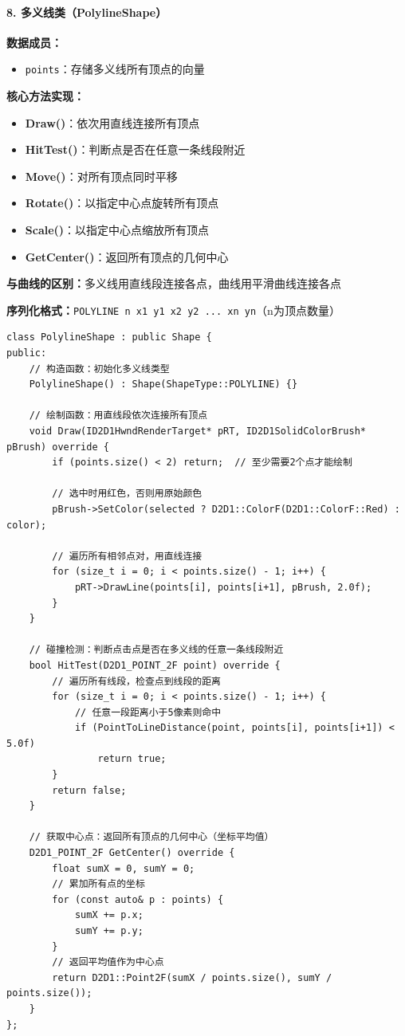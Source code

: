 \documentclass[12pt,a4paper]{article}
\begin{document}
\paragraph{8. 多义线类（PolylineShape）}

\begin{tcolorbox}
\textbf{数据成员：}
\begin{itemize}
    \item \texttt{points}：存储多义线所有顶点的向量
\end{itemize}

\textbf{核心方法实现：}
\begin{itemize}
    \item \textbf{Draw()}：依次用直线连接所有顶点
    \item \textbf{HitTest()}：判断点是否在任意一条线段附近
    \item \textbf{Move()}：对所有顶点同时平移
    \item \textbf{Rotate()}：以指定中心点旋转所有顶点
    \item \textbf{Scale()}：以指定中心点缩放所有顶点
    \item \textbf{GetCenter()}：返回所有顶点的几何中心
\end{itemize}

\textbf{与曲线的区别：}多义线用直线段连接各点，曲线用平滑曲线连接各点

\textbf{序列化格式：}\texttt{POLYLINE n x1 y1 x2 y2 ... xn yn}（n为顶点数量）
\end{tcolorbox}

\begin{lstlisting}[caption=PolylineShape类定义]
class PolylineShape : public Shape {
public:
    // 构造函数：初始化多义线类型
    PolylineShape() : Shape(ShapeType::POLYLINE) {}
    
    // 绘制函数：用直线段依次连接所有顶点
    void Draw(ID2D1HwndRenderTarget* pRT, ID2D1SolidColorBrush* pBrush) override {
        if (points.size() < 2) return;  // 至少需要2个点才能绘制
        
        // 选中时用红色，否则用原始颜色
        pBrush->SetColor(selected ? D2D1::ColorF(D2D1::ColorF::Red) : color);
        
        // 遍历所有相邻点对，用直线连接
        for (size_t i = 0; i < points.size() - 1; i++) {
            pRT->DrawLine(points[i], points[i+1], pBrush, 2.0f);
        }
    }
    
    // 碰撞检测：判断点击点是否在多义线的任意一条线段附近
    bool HitTest(D2D1_POINT_2F point) override {
        // 遍历所有线段，检查点到线段的距离
        for (size_t i = 0; i < points.size() - 1; i++) {
            // 任意一段距离小于5像素则命中
            if (PointToLineDistance(point, points[i], points[i+1]) < 5.0f)
                return true;
        }
        return false;
    }
    
    // 获取中心点：返回所有顶点的几何中心（坐标平均值）
    D2D1_POINT_2F GetCenter() override {
        float sumX = 0, sumY = 0;
        // 累加所有点的坐标
        for (const auto& p : points) {
            sumX += p.x;
            sumY += p.y;
        }
        // 返回平均值作为中心点
        return D2D1::Point2F(sumX / points.size(), sumY / points.size());
    }
};
\end{lstlisting}
\end{document}
